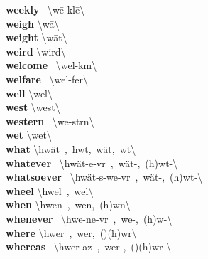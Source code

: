 \documentclass[10pt,a4paper]{article}
\begin{document}
\begin{multicols}{2}
\textbf{ weekly }\quad \ \textbackslash \textprimstress w\={e}-kl\={e}\textbackslash \\
\textbf{ weigh }\quad \textbackslash \textprimstress w\={a}\textbackslash \\
\textbf{ weight }\quad \textbackslash \textprimstress w\={a}t\textbackslash \\
\textbf{ weird }\quad \textbackslash \textprimstress wird\textbackslash \\
\textbf{ welcome }\quad \ \textbackslash \textprimstress wel-k\textschwa m\textbackslash \\
\textbf{ welfare }\quad \ \textbackslash \textprimstress wel-\textsecstress fer\textbackslash \\
\textbf{ well }\quad \textbackslash \textprimstress wel\textbackslash \\
\textbf{ west }\quad \textbackslash \textprimstress west\textbackslash \\
\textbf{ western }\quad \ \textbackslash \textprimstress we-st\textschwa rn\textbackslash \\
\textbf{ wet }\quad \textbackslash \textprimstress wet\textbackslash \\
\textbf{ what }\quad \textbackslash \textprimstress hw\"{a}t\ ,\ \textprimstress hw\textschwa t,\ \textprimstress w\"{a}t,\ \textprimstress w\textschwa t\textbackslash \\
\textbf{ whatever }\quad \ \textbackslash hw\"{a}t-\textprimstress e-v\textschwa r\ ,\ w\"{a}t-,\ (h)w\textschwa t-\textbackslash \\
\textbf{ whatsoever }\quad \ \textbackslash \textsecstress hw\"{a}t-s\textschwa -\textprimstress we-v\textschwa r\ ,\ \textsecstress w\"{a}t-,\ \textsecstress (h)w\textschwa t-\textbackslash \\
\textbf{ wheel }\quad \textbackslash \textprimstress hw\={e}l\ ,\ \textprimstress w\={e}l\textbackslash \\
\textbf{ when }\quad \textbackslash \textprimstress hwen\ ,\ \textprimstress wen,\ (h)w\textschwa n\textbackslash \\
\textbf{ whenever }\quad \ \textbackslash hwe-\textprimstress ne-v\textschwa r\ ,\ we-,\ (h)w\textschwa -\textbackslash \\
\textbf{ where }\quad \textbackslash \textprimstress hwer\ ,\ \textprimstress wer,\ (\textsecstress )(h)w\textschwa r\textbackslash \\
\textbf{ whereas }\quad \ \textbackslash hwer-\textprimstress az\ ,\ wer-,\ (\textsecstress )(h)w\textschwa r-\textbackslash \\

\end{multicols}
\end{document}
